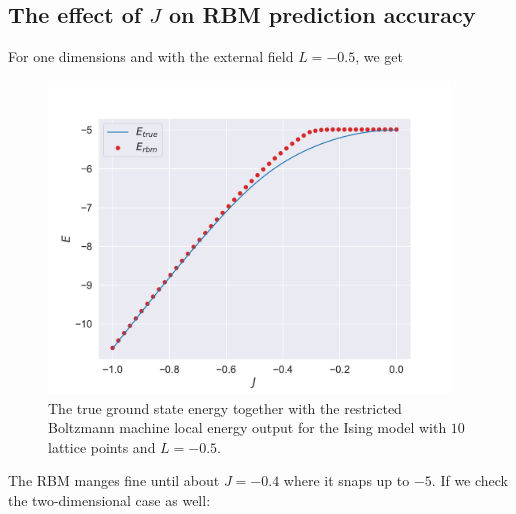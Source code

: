 \subsection{The effect of \texorpdfstring{$J$}{J} on RBM prediction accuracy}

For one dimensions and with the external field $L=-0.5$, we get
\begin{figure}[H]
  \begin{center}
    \includegraphics[width=0.95\textwidth]{Figures/Plots/Ising/val-true[J][-1.0-0.0][e=500][n=10][L=-0.5]}
  \end{center}
  \caption{The true ground state energy together with the restricted Boltzmann machine local energy output for the Ising model with $10$ lattice points and $L=-0.5$.}
\end{figure}

The RBM manges fine until about $J=-0.4$ where it snaps up to $-5$. If we check the two-dimensional case as well:

